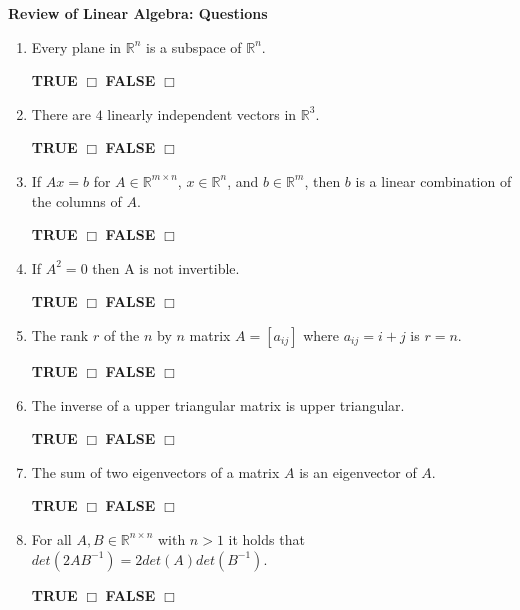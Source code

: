 \documentclass[14pt]{report}
\begin{document}
\textbf{{Review of Linear Algebra: Questions}}\\
\thispagestyle{empty}


\begin{enumerate}
\item Every plane in $\mathbb{R}^n$ is a subspace of $\mathbb{R}^n$.  

\quad \textbf{TRUE} $\Box$ \quad\textbf{FALSE} $\Box$ 

\item There are $4$ linearly independent vectors in $\mathbb{R}^3$. 

\quad \textbf{TRUE} $\Box$ \quad\textbf{FALSE} $\Box$ 

\item If $Ax=b$ for $A \in \mathbb{R}^{m\times n}$, $x\in\mathbb{R}^n$, and  $b\in\mathbb{R}^m$, then $b$ is a linear combination of the columns of $A$.

 \quad \textbf{TRUE} $\Box$ \quad\textbf{FALSE} $\Box$


\item If $A^2=0$ then A is not invertible.

 \quad \textbf{TRUE} $\Box$ \quad\textbf{FALSE} $\Box$ 



\item The rank $r$ of the $n$ by $n$ matrix $A=[a_{ij}]$ where $a_{ij}=i+j$ is $r=n$.

 \quad \textbf{TRUE} $\Box$ \quad\textbf{FALSE} $\Box$


 

\item The inverse of a upper triangular matrix is upper triangular. 

\quad \textbf{TRUE} $\Box$ \quad\textbf{FALSE} $\Box$ 

\item The sum of two eigenvectors of a matrix $A$ is an eigenvector of $A$. 

\quad \textbf{TRUE} $\Box$ \quad\textbf{FALSE} $\Box$ 

\item For all $A,B \in \mathbb{R}^{n \times n}$ with $n >1$ it holds that $det(2AB^{-1})=2det(A)det(B^{-1})$. 

\quad \textbf{TRUE} $\Box$ \quad\textbf{FALSE} $\Box$ 


\end{enumerate}
\end{document}
